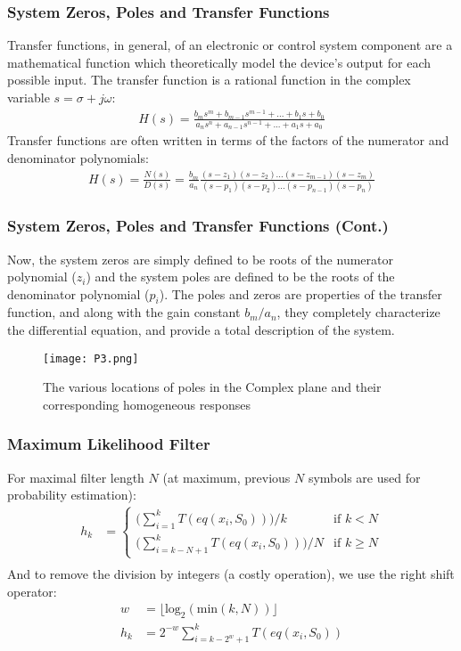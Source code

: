 \documentclass{beamer}
\begin{document}
\begin{frame}
\frametitle{System Zeros, Poles and Transfer Functions}
Transfer functions, in general, of an electronic or control system component are a mathematical function which theoretically model the device's output for each possible input.
\newline The transfer function is a rational function in the complex variable $s = \sigma + j\omega$:
\begin{align}
    H(s)=\frac{b_ms^m+b_{m-1}s^{m-1}+...+b_1s+b_0}{a_ns^n+a_{n-1}s^{n-1}+...+a_1s+a_0}
\end{align}
Transfer functions are often written in terms of the factors of the numerator and denominator polynomials:
\begin{align}
    H(s)=\frac{N(s)}{D(s)}=\frac{b_m}{a_n}\frac{(s-z_1)(s-z_2)...(s-z_{m-1})(s-z_m)}{(s-p_1)(s-p_2)...(s-p_{n-1})(s-p_n)}
\end{align}
\end{frame}

\begin{frame}
\frametitle{System Zeros, Poles and Transfer Functions (Cont.)}
Now, the system zeros are simply defined to be roots of the numerator polynomial ($z_i$) and the system poles are defined to be the roots of the denominator polynomial ($p_i$).
\newline The poles and zeros are properties of the transfer function, and along with the gain constant $b_m/a_n$, they completely characterize the differential equation, and provide a total description of the system.
\begin{figure}
\texttt{[image: P3.png]}
\caption{The various locations of poles in the Complex plane and their corresponding homogeneous responses}
\end{figure}
\end{frame}

\begin{frame}
\frametitle{Maximum Likelihood Filter}
For maximal filter length $N$ (at maximum, previous $N$ symbols are used for probability estimation):
\begin{align}
    h_k &= \begin{cases} \bigg( \sum_{i=1}^k T (eq(x_i,S_0)) \bigg) / k &\mbox{if } k < N  \\
    \bigg( \sum_{i=k-N+1}^k T (eq(x_i,S_0)) \bigg) / N &\mbox{if } k \geq N \end{cases} \\ 
\end{align}
And to remove the division by integers (a costly operation), we use the right shift operator:
\begin{align}
    w &= \lfloor \mbox{log}_2(\mbox{min}(k,N)) \rfloor \\
    h_k &= 2^{-w} \sum_{i=k-2^w+1}^k T (eq(x_i,S_0))
\end{align}
\end{frame}
\end{document}
